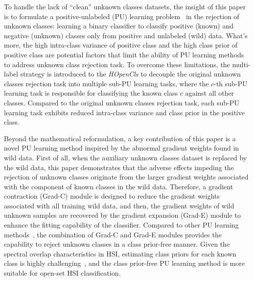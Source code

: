 To handle the lack of ``clean'' unknown classes datasets, the insight of this paper is to formulate a positive-unlabeled (PU) learning problem~\cite{DistPU,T-HOneCls} in the rejection of unknown classes: learning a binary classifier to classify positive (known) and negative (unknown) classes only from positive and unlabeled (wild) data. What's more, the high intra-class variance of positive class and the high class prior of positive class are potential factors that limit the ability of PU learning methods to address unknown class rejection task. To overcome these limitations, the multi-label strategy is introduced to the \textit{HOpenCls} to decouple the original unknown classes rejection task into multiple sub-PU learning tasks, where the $c$-th sub-PU learning task is responsible for classifying the known class $c$ against all other classes. Compared to the original unknown classes rejection task, each sub-PU learning task exhibits reduced intra-class variance and class prior in the positive class.

Beyond the mathematical reformulation, a key contribution of this paper is a novel PU learning method inspired by the abnormal gradient weights found in wild data. First of all, when the auxiliary unknown classes dataset is replaced by the wild data, this paper demonstrates that the adverse effects impeding the rejection of unknown classes originate from the larger gradient weights associated with the component of known classes in the wild data. Therefore, a gradient contraction (Grad-C) module is designed to reduce the gradient weights associated with all training wild data, and then, the gradient weights of wild unknown samples are recovered by the gradient expansion (Grad-E) module to enhance the fitting capability of the classifier. Compared to other PU learning methods~\cite{nnPU,DistPU,PUET,HOneCls}, the combination of Grad-C and Grad-E modules provides the capability to reject unknown classes in a class prior-free manner. Given the spectral overlap characteristics in HSI, estimating class priors for each known class is highly challenging~\cite{T-HOneCls}, and the class prior-free PU learning method is more suitable for open-set HSI classification.

